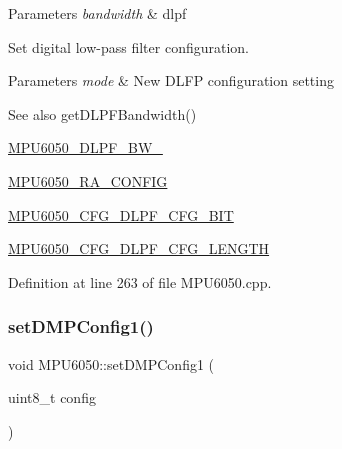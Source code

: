 \begin{DoxyParams}{Parameters}
{\em bandwidth} & dlpf\\
\hline
\end{DoxyParams}
Set digital low-\/pass filter configuration. 
\begin{DoxyParams}{Parameters}
{\em mode} & New D\+L\+FP configuration setting \\
\hline
\end{DoxyParams}
\begin{DoxySeeAlso}{See also}
get\+D\+L\+P\+F\+Bandwidth() 

\mbox{\hyperlink{MPU6050_8h_a69e8618585558f2ef5cec3116726ca60}{M\+P\+U6050\+\_\+\+D\+L\+P\+F\+\_\+\+B\+W\+\_}} 

\mbox{\hyperlink{MPU6050_8h_a51c78b27e0368d91c94209dbeca4df90}{M\+P\+U6050\+\_\+\+R\+A\+\_\+\+C\+O\+N\+F\+IG}} 

\mbox{\hyperlink{MPU6050_8h_adf909a696e2ebf9ba3dba9570ae02af2}{M\+P\+U6050\+\_\+\+C\+F\+G\+\_\+\+D\+L\+P\+F\+\_\+\+C\+F\+G\+\_\+\+B\+IT}} 

\mbox{\hyperlink{MPU6050_8h_a119feeb54b957c50e0beba3f6aa2458f}{M\+P\+U6050\+\_\+\+C\+F\+G\+\_\+\+D\+L\+P\+F\+\_\+\+C\+F\+G\+\_\+\+L\+E\+N\+G\+TH}} 
\end{DoxySeeAlso}


Definition at line 263 of file M\+P\+U6050.\+cpp.


\begin{DoxyCode}{0}

\end{DoxyCode}
\mbox{\label{classMPU6050_a0126b95e4074de16bb61d9c4e4cf837f}} 
\subsubsection{\texorpdfstring{setDMPConfig1()}{setDMPConfig1()}}
{\footnotesize\ttfamily void M\+P\+U6050\+::set\+D\+M\+P\+Config1 (\begin{DoxyParamCaption}\item[{uint8\+\_\+t}]{config }\end{DoxyParamCaption})}



